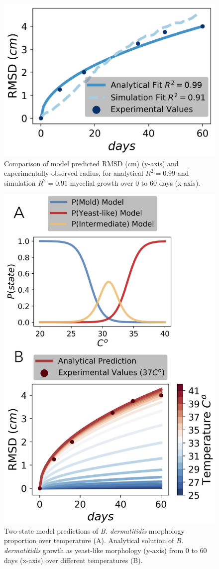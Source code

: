 \documentclass[preprint,12pt]{elsarticle}
\begin{document}
\begin{figure}[h]
\centering\includegraphics[width=1.0\linewidth]{fig2.png}
\caption{Comparison of model predicted RMSD (cm) (y-axis) and experimentally observed radius, for analytical $R^{2}= 0.99$ and simulation $R^{2}= 0.91$ mycelial growth over 0 to 60 days (x-axis).}
\end{figure}

\begin{figure}[h]
\centering\includegraphics[width=.80\linewidth]{fig3.png}
\caption{ Two-state model predictions of \textit{B. dermatitidis} morphology proportion over temperature (A). Analytical solution of \textit{B. dermatitidis} growth as yeast-like morphology (y-axis) from 0 to 60 days (x-axis) over different temperatures (B).}
\end{figure}
\end{document}
